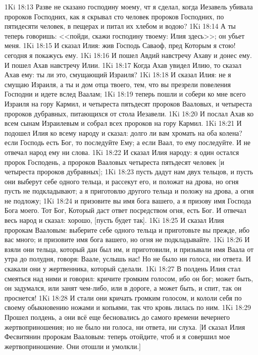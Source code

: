 \vs 1Ki 18:13 Разве не сказано господину моему, чт я сделал, когда Иезавель убивала пророков Господних, как я скрывал сто человек пророков Господних, по пятидесяти человек, в пещерах и питал их хлебом и водою?
\vs 1Ki 18:14 А ты теперь говоришь: <<пойди, скажи господину твоему: Илия здесь>>; он убьет меня.
\vs 1Ki 18:15 И сказал Илия: жив Господь Саваоф, пред Которым я стою! сегодня я покажусь ему.
\vs 1Ki 18:16 И пошел Авдий навстречу Ахаву и донес ему. И пошел Ахав навстречу Илии.
\vs 1Ki 18:17 Когда Ахав увидел Илию, то сказал Ахав ему: ты ли это, смущающий Израиля?
\vs 1Ki 18:18 И сказал Илия: не я смущаю Израиля, а ты и дом отца твоего, тем, что вы презрели повеления Господни и идете вслед Ваалам;
\vs 1Ki 18:19 теперь пошли и собери ко мне всего Израиля на гору Кармил, и четыреста пятьдесят пророков Вааловых, и четыреста пророков дубравных, питающихся от стола Иезавели.
\vs 1Ki 18:20 И послал Ахав ко всем сынам Израилевым и собрал всех пророков на гору Кармил.
\vs 1Ki 18:21 И подошел Илия ко всему народу и сказал: долго ли вам хромать на оба колена? если Господь есть Бог, то последуйте Ему; а если Ваал, то ему последуйте. И не отвечал народ ему ни слова.
\vs 1Ki 18:22 И сказал Илия народу: я один остался пророк Господень, а пророков Вааловых четыреста пятьдесят человек [и четыреста пророков дубравных];
\vs 1Ki 18:23 пусть дадут нам двух тельцов, и пусть они выберут себе одного тельца, и рассекут его, и положат на дрова, но огня пусть не подкладывают; а я приготовлю другого тельца и положу на дрова, а огня не подложу;
\vs 1Ki 18:24 и призовите вы имя бога вашего, а я призову имя Господа Бога моего. Тот Бог, Который даст ответ посредством огня, есть Бог. И отвечал весь народ и сказал: хорошо, [пусть будет так].
\vs 1Ki 18:25 И сказал Илия пророкам Вааловым: выберите себе одного тельца и приготовьте вы прежде, ибо вас много; и призовите имя бога вашего, но огня не подкладывайте.
\vs 1Ki 18:26 И взяли они тельца, который дан был им, и приготовили, и призывали имя Ваала от утра до полудня, говоря: Ваале, услышь нас! Но не было ни голоса, ни ответа. И скакали они у жертвенника, который сделали.
\vs 1Ki 18:27 В полдень Илия стал смеяться над ними и говорил: кричите громким голосом, ибо он бог; может быть, он задумался, или занят чем-либо, или в дороге, а может быть, и спит, так он проснется!
\vs 1Ki 18:28 И стали они кричать громким голосом, и кололи себя по своему обыкновению ножами и копьями, так что кровь лилась по ним.
\vs 1Ki 18:29 Прошел полдень, а они всё еще бесновались до самого времени вечернего жертвоприношения; но не было ни голоса, ни ответа, ни слуха. [И сказал Илия Фесвитянин пророкам Вааловым: теперь отойдите, чтоб и я совершил мое жертвоприношение. Они отошли и умолкли.]
